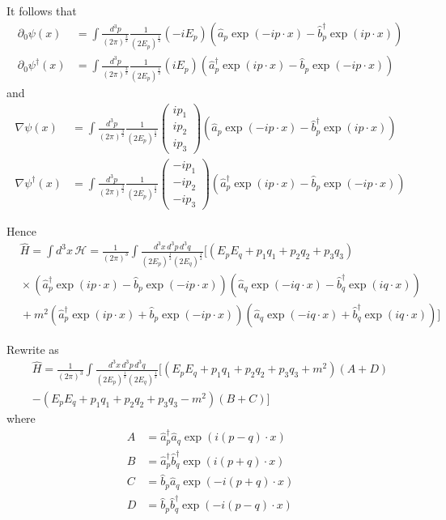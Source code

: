 It follows that
\begin{align*}
\partial_0\psi(x)&=\int\frac{d^3p}{(2\pi)^\frac{3}{2}}\frac{1}{(2E_p)^\frac{1}{2}}(-iE_p)
\left(\hat a_p\exp(-ip\cdot x)-\hat b_p^\dag\exp(ip\cdot x)\right)
\\
\partial_0\psi^\dag(x)&=\int\frac{d^3p}{(2\pi)^\frac{3}{2}}\frac{1}{(2E_p)^\frac{1}{2}}(iE_p)
\left(\hat a_p^\dag\exp(ip\cdot x)-\hat b_p\exp(-ip\cdot x)\right)
\end{align*}
and
\begin{align*}
\nabla\psi(x)&=\int\frac{d^3p}{(2\pi)^\frac{3}{2}}\frac{1}{(2E_p)^\frac{1}{2}}
\begin{pmatrix}
ip_1\\ip_2\\ip_3
\end{pmatrix}
\left(\hat a_p\exp(-ip\cdot x)-\hat b_p^\dag\exp(ip\cdot x)\right)
\\
\nabla\psi^\dag(x)&=\int\frac{d^3p}{(2\pi)^\frac{3}{2}}\frac{1}{(2E_p)^\frac{1}{2}}
\begin{pmatrix}
-ip_1\\-ip_2\\-ip_3
\end{pmatrix}
\left(\hat a_p^\dag\exp(ip\cdot x)-\hat b_p\exp(-ip\cdot x)\right)
\end{align*}

Hence
\begin{align*}
&\hat H=\int d^3x\,\mathcal H=\frac{1}{(2\pi)^3}\int\frac{d^3x\,d^3p\,d^3q}{(2E_p)^\frac{1}{2}(2E_q)^\frac{1}{2}}
\bigg[
(E_pE_q+p_1q_1+p_2q_2+p_3q_3)
\\
&{}\times
\left(\hat a_p^\dag\exp(ip\cdot x)-\hat b_p\exp(-ip\cdot x)\right)
\left(\hat a_q\exp(-iq\cdot x)-\hat b_q^\dag\exp(iq\cdot x)\right)
\\
&{}+m^2
\left(\hat a_p^\dag\exp(ip\cdot x)+\hat b_p\exp(-ip\cdot x)\right)
\left(\hat a_q\exp(-iq\cdot x)+\hat b_q^\dag\exp(iq\cdot x)\right)
\bigg]
\end{align*}

Rewrite as
\begin{multline*}
\hat H=\frac{1}{(2\pi)^3}\int\frac{d^3x\,d^3p\,d^3q}{(2E_p)^\frac{1}{2}(2E_q)^\frac{1}{2}}
\bigg[(E_pE_q+p_1q_1+p_2q_2+p_3q_3+m^2)(A+D)
\\
-(E_pE_q+p_1q_1+p_2q_2+p_3q_3-m^2)(B+C)\bigg]
\end{multline*}
where
\begin{align*}
A&=\hat a_p^\dag\hat a_q\exp(i(p-q)\cdot x)
\\
B&=\hat a_p^\dag\hat b_q^\dag\exp(i(p+q)\cdot x)
\\
C&=\hat b_p\hat a_q\exp(-i(p+q)\cdot x)
\\
D&=\hat b_p\hat b_q^\dag\exp(-i(p-q)\cdot x)
\end{align*}

